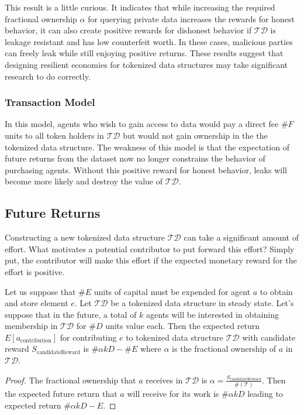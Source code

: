 \documentclass{llncs}
\begin{document}
This result is a little curious. It indicates that while increasing the required fractional ownership $\alpha$ for querying private data increases the rewards for honest behavior, it can also create positive rewards for dishonest behavior if $\mathcal{TD}$ is leakage resistant and has low counterfeit worth. In these cases, malicious parties can freely leak while still enjoying positive returns. These results suggest that designing resilient economies for tokenized data structures may take significant research to do correctly.

\subsubsection{Transaction Model}

In this model, agents who wish to gain access to data would pay a direct fee $\#F$ units to all token holders in $\mathcal{TD}$ but would not gain ownership in the the tokenized data structure. The weakness of this model is that the expectation of future returns from the dataset now no longer constrains the behavior of purchasing agents. Without this positive reward for honest behavior, leaks will become more likely and destroy the value of $\mathcal{TD}$.


\subsection{Future Returns}

Constructing a new tokenized data structure $\mathcal{TD}$ can take a significant amount of effort. What motivates a potential contributor to put forward this effort? Simply put, the contributor will make this effort if the expected monetary reward for the effort is positive.

\begin{theorem}
Let us suppose that $\#E$ units of capital must be expended for agent $a$ to obtain and store element $e$. Let $\mathcal{TD}$ be a tokenized data structure in steady state. Let's suppose that in the future, a total of $k$ agents will be interested in obtaining membership in $\mathcal{TD}$ for $\#D$ units value each. Then the expected return $E[a_\text{contribution}]$ for contributing $e$ to tokenized data structure $\mathcal{TD}$ with candidate reward $S_\text{candidateReward}$ is $\#\alpha k D - \#E$ where $\alpha$ is the fractional ownership of $a$ in $\mathcal{TD}$.
\end{theorem}
\begin{proof}
The fractional ownership that $a$ receives in $\mathcal{TD}$ is $\alpha = \frac{S_\text{candidateReward}}{\#(\mathcal{T})}$. Then the expected future return that $a$ will receive for its work is $\#\alpha k D$ leading to expected return $\# \alpha k D - E$.
\end{proof}
\end{document}
